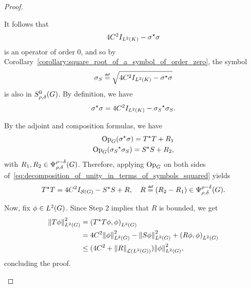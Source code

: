 \begin{proof}
\begin{description}
            It follows that
            \begin{align*}
                4 C^2 \Id {\Lebesgue 2 \CompactGroup} - \adj \sigma \sigma
            \end{align*}
            is an operator of order $0$,
            and so by Corollary~\ref{corollary:square_root_of_a_symbol_of_order_zero}, the symbol
            \begin{align*}
                \sigma_S \defeq \sqrt{4 C^2 \Id {\Lebesgue 2 \CompactGroup} - \adj \sigma \sigma}
            \end{align*}
            is also in $\SymbolClass 0 {\rho, \delta}$.
            By definition, we have
            \begin{align}
                \adj \sigma \sigma = 4 C^2 \Id {\Lebesgue 2 \CompactGroup} - \adj {\sigma_S} \sigma_S.
                \label{eq:decomposition_of_unity_in_terms_of_symbols_squared}
            \end{align}

            By the adjoint and composition formulas,
            we have
            \begin{align*}
                \Op(\adj \sigma \sigma) = \adj T T + R_1\\
                \Op(\adj {\sigma_S} \sigma_S) = \adj S S +  R_2,
            \end{align*}
            with $R_1, R_2 \in \OperatorClass {\rho - \delta} {\rho, \delta}$.
            Therefore, applying $\Op$ on both sides of~\eqref{eq:decomposition_of_unity_in_terms_of_symbols_squared} yields
            \begin{align*}
                \adj T T = 4 C^2 \Id {\Schwartz \Group} - \adj S S + R,
                \quad R \defeq (R_2 - R_1) \in \OperatorClass {\rho - \delta} {\rho, \delta}.
            \end{align*}

            Now, fix $\phi \in \Lebesgue 2 \Group$.
            Since Step 2 implies that $R$ is bounded,
            we get
            \begin{align*}
                \norm [\Lebesgue 2 \Group] {T \phi}^2
                &= \ip [\Lebesgue 2 \Group] {\adj T T \phi} \phi\\
                &= 4 C^2 \norm [\Lebesgue 2 \Group] \phi^2 - \norm [\Lebesgue 2 \Group] {S \phi}^2 + \ip [\Lebesgue 2 \Group] {R \phi} {\phi}\\
                &\leq (4 C^2 + \norm [\Lin {\Lebesgue 2 \Group}] R) \norm [\Lebesgue 2 \Group] \phi^2,
            \end{align*}
            concluding the proof.
    \end{description}
\end{proof}
